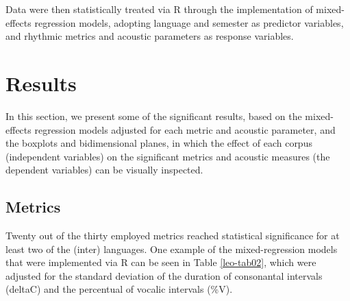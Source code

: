 
Data were then statistically treated via R \citep{r2021} %
through the implementation of mixed-effects regression models, adopting language and
semester as predictor variables, and rhythmic metrics and acoustic parameters
as response variables.

\section{Results}
In this section, we present some of the significant results, based on the
mixed-effects regression models adjusted for each metric and acoustic
parameter, and the boxplots and bidimensional planes, in which the effect of
each corpus (independent variables) on the significant metrics and acoustic
measures (the dependent variables) can be visually inspected.

\subsection{Metrics}
Twenty out of the thirty employed metrics reached statistical significance for
at least two of the (inter) languages. One example of the mixed-regression
models that were implemented via R can be seen in Table \ref{leo-tab02}, which were adjusted
for the standard deviation of the duration of consonantal intervals (deltaC)
and the percentual of vocalic intervals (\%V).

